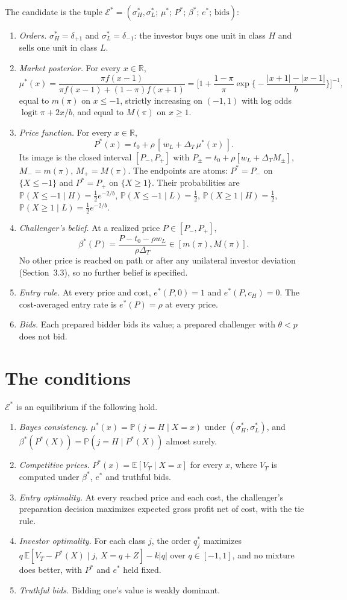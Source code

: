 \documentclass[12pt]{article}
\theoremstyle{remark}
\newcommand{\E}{\mathbb E}
\renewcommand{\Pr}{\mathbb P}
\newcommand{\R}{\mathbb R}
\newcommand{\Dt}{\Delta_T}
\begin{document}
The candidate is the tuple $\mathcal E^*=(\sigma_H^*,\sigma_L^*;\,\mu^*;\,P^*;\,\beta^*;\,e^*;\,\text{bids})$:
\begin{enumerate}
\item \emph{Orders.} $\sigma_H^*=\delta_{+1}$ and $\sigma_L^*=\delta_{-1}$: the investor buys one
  unit in class $H$ and sells one unit in class $L$.
\item \emph{Market posterior.} For every $x\in\R$,
  \[
  \mu^*(x)=\frac{\pi f(x-1)}{\pi f(x-1)+(1-\pi)f(x+1)}
  =\Big[1+\frac{1-\pi}{\pi}\exp\Big\{-\frac{|x+1|-|x-1|}{b}\Big\}\Big]^{-1},
  \]
  equal to $m(\pi)$ on $x\le-1$, strictly increasing on $(-1,1)$ with log odds
  $\operatorname{logit}\pi+2x/b$, and equal to $M(\pi)$ on $x\ge1$.
\item \emph{Price function.} For every $x\in\R$,
  \[
  P^*(x)=t_0+\rho\,[\,w_L+\Dt\,\mu^*(x)\,].
  \]
  Its image is the closed interval $[P_-,P_+]$ with $P_\pm=t_0+\rho[w_L+\Dt M_\pm]$,
  $M_-=m(\pi)$, $M_+=M(\pi)$. The endpoints are atoms: $P^*=P_-$ on $\{X\le-1\}$ and
  $P^*=P_+$ on $\{X\ge1\}$. Their probabilities are $\Pr(X\le-1\mid H)=\tfrac12e^{-2/b}$,
  $\Pr(X\le-1\mid L)=\tfrac12$, $\Pr(X\ge1\mid H)=\tfrac12$, $\Pr(X\ge1\mid L)=\tfrac12e^{-2/b}$.
\item \emph{Challenger's belief.} At a realized price $P\in[P_-,P_+]$,
  \[
  \beta^*(P)=\frac{P-t_0-\rho w_L}{\rho\Dt}\in[m(\pi),M(\pi)].
  \]
  No other price is reached on path or after any unilateral investor deviation (Section~3.3), so
  no further belief is specified.
\item \emph{Entry rule.} At every price and cost, $e^*(P,0)=1$ and $e^*(P,c_H)=0$. The
  cost-averaged entry rate is $e^*(P)=\rho$ at every price.
\item \emph{Bids.} Each prepared bidder bids its value; a prepared challenger with
  $\theta<p$ does not bid.
\end{enumerate}

\section{The conditions}

$\mathcal E^*$ is an equilibrium if the following hold.
\begin{enumerate}
\item[(C1)] \emph{Bayes consistency.} $\mu^*(x)=\Pr(j=H\mid X=x)$ under $(\sigma_H^*,\sigma_L^*)$,
  and $\beta^*(P^*(X))=\Pr(j=H\mid P^*(X))$ almost surely.
\item[(C2)] \emph{Competitive prices.} $P^*(x)=\E[V_T\mid X=x]$ for every $x$, where $V_T$ is
  computed under $\beta^*$, $e^*$ and truthful bids.
\item[(C3)] \emph{Entry optimality.} At every reached price and each cost, the challenger's
  preparation decision maximizes expected gross profit net of cost, with the tie rule.
\item[(C4)] \emph{Investor optimality.} For each class $j$, the order $q_j^*$ maximizes
  $q\,\E[V_T-P^*(X)\mid j,\,X=q+Z]-k|q|$ over $q\in[-1,1]$, and no mixture does better,
  with $P^*$ and $e^*$ held fixed.
\item[(C5)] \emph{Truthful bids.} Bidding one's value is weakly dominant.
\end{enumerate}
\end{document}

